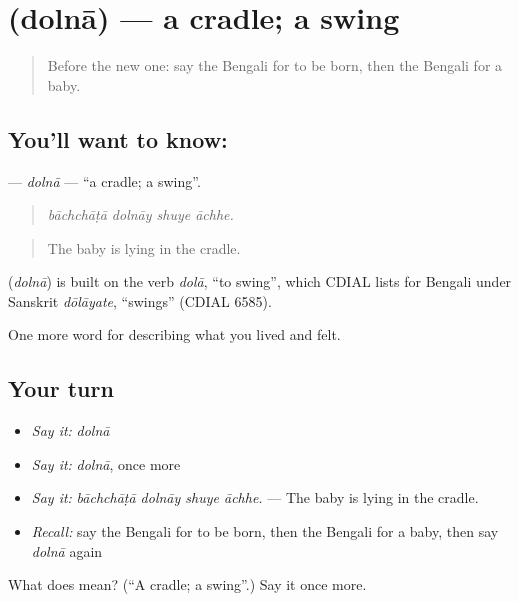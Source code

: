 \section[\texorpdfstring{\bn{দোলনা} (dolnā)}{দোলনা (dolnā)}]{ (dolnā) — a cradle; a swing}

\label{lesson:BN-C485-dolna}



\begin{quote}
Before the new one: say the Bengali for to be born, then the Bengali for a baby.
\end{quote}

\subsection*{You'll want to know: }
\textbf{} — \emph{dolnā} — \textquotedblleft{}a cradle; a swing\textquotedblright{}.

\begin{quote}
   
\end{quote}

\begin{quote}
\emph{bāchchāṭā dolnāy shuye āchhe.}
\end{quote}

\begin{quote}
The baby is lying in the cradle.
\end{quote}

\begin{cousinweb}
\textbf{} (\emph{dolnā}) is built on the verb \emph{dolā}, \textquotedblleft{}to swing\textquotedblright{}, which CDIAL lists for Bengali under Sanskrit \emph{dōlāyate}, \textquotedblleft{}swings\textquotedblright{} (CDIAL 6585).
\end{cousinweb}

\begin{grammarlens}[title={What you've built}]
One more word for describing what you lived and felt.
\end{grammarlens}

\subsection*{Your turn}
\begin{itemize}
\raggedright
  \item \emph{Say it:} \emph{dolnā}
  \item \emph{Say it:} \emph{dolnā}, once more
  \item \emph{Say it:} \emph{bāchchāṭā dolnāy shuye āchhe.} — The baby is lying in the cradle.
  \item \emph{Recall:} say the Bengali for to be born, then the Bengali for a baby, then say \emph{dolnā} again
\end{itemize}

\begin{tcolorbox}[breakable,colback=teal!4,colframe=teal!35!black,title={Before you move on}]
What does  mean? (\textquotedblleft{}A cradle; a swing\textquotedblright{}.) Say it once more.
\end{tcolorbox}
